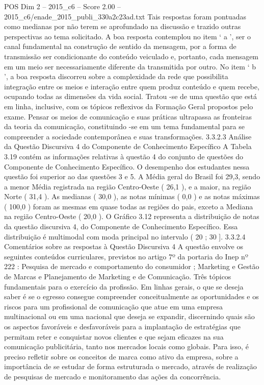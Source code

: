 \begin{textsample}{POS Dim 2 – 2015\_c6 – Score 2.00 – 2015\_c6/enade\_2015\_publi\_330a2c23ad.txt}
Tais respostas foram pontuadas como medianas por não terem se aprofundado na discussão e trazido outras perspectivas ao tema solicitado.
A boa resposta contemplou no item ‘ a ’, ser o canal fundamental na construção de sentido da mensagem, por a forma de transmissão ser condicionante do conteúdo veiculado e, portanto, cada mensagem em um meio ser necessariamente diferente da transmitida por outro.
No item ‘ b ’, a boa resposta discorreu sobre a complexidade da rede que possibilita integração entre os meios e interação entre quem produz conteúdo e quem recebe, ocupando todas as dimensões da vida social.
Tratou -se de uma questão que está em linha, inclusive, com os tópicos reflexivos da Formação Geral propostos pelo exame.
Pensar os meios de comunicação e suas práticas ultrapassa as fronteiras da teoria da comunicação, constituindo -se em um tema fundamental para se compreender a sociedade contemporânea e suas transformações. 3.3.2.3 Análise da Questão Discursiva 4 do Componente de Conhecimento Específico A Tabela 3.19 contém as informações relativas à questão 4 do conjunto de questões do Componente de Conhecimento Específico.
O desempenho dos estudantes nessa questão foi superior ao das questões 3 e 5.
A Média geral do Brasil foi 29,3, sendo a menor Média registrada na região Centro-Oeste ( 26,1 ), e a maior, na região Norte ( 31,4 ).
As medianas ( 30,0 ), as notas mínimas ( 0,0 ) e as notas máximas ( 100,0 ) foram as mesmas em quase todas as regiões do pais, exceto a Mediana na região Centro-Oeste ( 20,0 ).
O Gráfico 3.12 representa a distribuição de notas da questão discursiva 4, do Componente de Conhecimento Específico.
Essa distribuição é multimodal com moda principal no intervalo ( 20 ; 30 ]. 3.3.2.4 Comentários sobre as respostas à Questão Discursiva 4 A questão envolve os seguintes conteúdos curriculares, previstos no artigo 7º da portaria do Inep nº 222 : Pesquisa de mercado e comportamento do consumidor ; Marketing e Gestão de Marcas e Planejamento de Marketing e de Comunicação.
Três tópicos fundamentais para o exercício da profissão.
Em linhas gerais, o que se deseja saber é se o egresso consegue compreender conceitualmente as oportunidades e os riscos para um profissional de comunicação que atue em uma empresa multinacional ou em uma nacional que deseja se expandir, discernindo quais são os aspectos favoráveis e desfavoráveis para a implantação de estratégias que permitam reter e conquistar novos clientes e que sejam eficazes na sua comunicação publicitária, tanto nos mercados locais como globais.
Para isso, é preciso refletir sobre os conceitos de marca como ativo da empresa, sobre a importância de se estudar de forma estruturada o mercado, através de realização de pesquisas de mercado e monitoramento das ações da concorrência.

\end{textsample}
